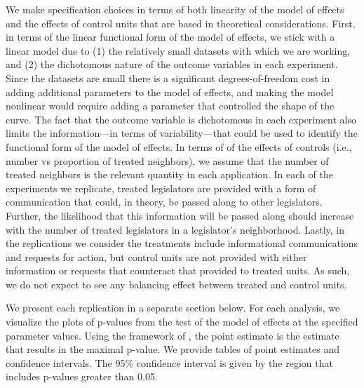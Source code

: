 \documentclass[12pt]{article}
\begin{document}
We make specification choices in terms of both linearity of the model of effects and the effects of control units that are based in theoretical considerations. First, in terms of the linear functional form of the model of effects, we stick with a linear model due to (1) the relatively small datasets with which we are working, and (2) the dichotomous nature of the outcome variables in each experiment. Since the datasets are small there is a significant degrees-of-freedom cost in adding additional parameters to the model of effects, and making the model nonlinear would require adding a parameter that controlled the shape of the curve. The fact that the outcome variable is dichotomous in each experiment also limits the information---in terms of variability---that could be used to identify the functional form of the model of effects. In terms of of the effects of controls (i.e., number vs proportion of treated neighbors), we assume that the number of treated neighbors is the relevant quantity in each application.  In each of the experiments we replicate, treated legislators are provided with a form of communication that could, in theory, be passed along to other legislators. Further, the likelihood that this information will be passed along should increase with the number of treated legislators in a legislator's neighborhood. Lastly, in the replications we consider the treatments include informational communications and requests for action, but control units are not provided with either information or requests that counteract that provided to treated units. As such, we do not expect to see any balancing effect between treated and control units.

We present each replication in a separate section below. For each analysis, we visualize the plots of p-values from the test of the model of effects at the specified parameter values. Using the framework of \citet{bowers2012reasoning}, the point estimate is the estimate that results in the maximal p-value. We provide tables of point estimates and confidence intervals. The 95\% confidence interval is given by the region that includes p-values greater than 0.05.

\subsection{\citet{butler2011can}}
\end{document}
